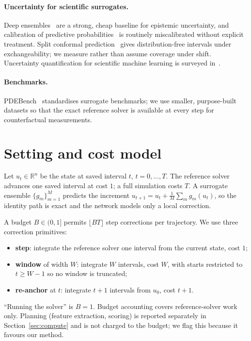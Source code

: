 \documentclass[11pt]{article}
\begin{document}
\paragraph{Uncertainty for scientific surrogates.} Deep
ensembles~\cite{lakshminarayanan2017deep} are a strong, cheap baseline for
epistemic uncertainty, and calibration of predictive
probabilities~\cite{guo2017calibration} is routinely miscalibrated without
explicit treatment. Split conformal prediction~\cite{vovk2005algorithmic,
angelopoulos2021gentle} gives distribution-free intervals under exchangeability;
we measure rather than assume coverage under shift. Uncertainty quantification
for scientific machine learning is surveyed
in~\cite{psaros2023uncertainty}.

\paragraph{Benchmarks.} PDEBench~\cite{takamoto2022pdebench} standardises
surrogate benchmarks; we use smaller, purpose-built datasets so that the exact
reference solver is available at every step for counterfactual measurements.

\section{Setting and cost model}
\label{sec:cost}

Let $u_t\in\mathbb{R}^{n}$ be the state at saved interval $t$, $t=0,\dots,T$.
The reference solver advances one saved interval at cost $1$; a full simulation
costs $T$. A surrogate ensemble $\{g_m\}_{m=1}^{M}$ predicts the increment
$u_{t+1}=u_t+\frac1M\sum_m g_m(u_t)$, so the identity path is exact and the
network models only a local correction.

A budget $B\in(0,1]$ permits $\lfloor BT\rfloor$ step corrections per
trajectory. We use three correction primitives:
\begin{itemize}
\item \textbf{step}: integrate the reference solver one interval from the
  current state, cost $1$;
\item \textbf{window} of width $W$: integrate $W$ intervals, cost $W$, with
  starts restricted to $t\ge W-1$ so no window is truncated;
\item \textbf{re-anchor} at $t$: integrate $t+1$ intervals from $u_0$, cost
  $t+1$.
\end{itemize}
``Running the solver'' is $B=1$. Budget accounting covers reference-solver work
only. Planning (feature extraction, scoring) is reported separately in
Section~\ref{sec:compute} and is not charged to the budget; we flag this because
it favours our method.
\end{document}
